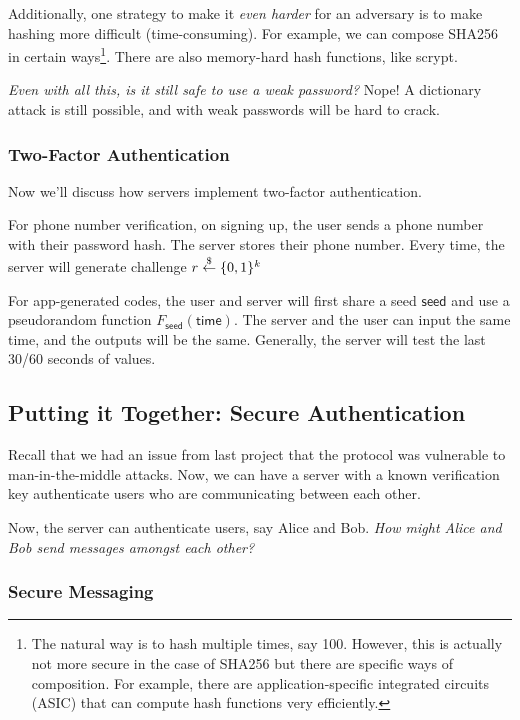 Additionally, one strategy to make it \emph{even harder} for an adversary is to make hashing more difficult (time-consuming). For example, we can compose SHA256 in certain ways\footnote{The natural way is to hash multiple times, say 100. However, this is actually not more secure in the case of SHA256 but there are specific ways of composition. For example, there are application-specific integrated circuits (ASIC) that can compute hash functions very efficiently.}. There are also memory-hard hash functions, like scrypt.

\emph{Even with all this, is it still safe to use a weak password?} Nope! A dictionary attack is still possible, and with weak passwords will be hard to crack.

\subsubsection{Two-Factor Authentication}
Now we'll discuss how servers implement two-factor authentication.

For phone number verification, on signing up, the user sends a phone number with their password hash. The server stores their phone number. Every time, the server will generate challenge $r\overset{\$}{\leftarrow}\{0,1\}^k$

For app-generated codes, the user and server will first share a seed $\mathsf{seed}$ and use a pseudorandom function $F_\mathsf{seed}(\mathsf{time})$. The server and the user can input the same time, and the outputs will be the same. Generally, the server will test the last 30/60 seconds of values.


\subsection{Putting it Together: Secure Authentication}

Recall that we had an issue from last project that the protocol was vulnerable to man-in-the-middle attacks. Now, we can have a server with a known verification key authenticate users who are communicating between each other.


Now, the server can authenticate users, say Alice and Bob. \emph{How might Alice and Bob send messages amongst each other?}

\subsubsection{Secure Messaging}\label{sec:feb23-secure-messaging}

